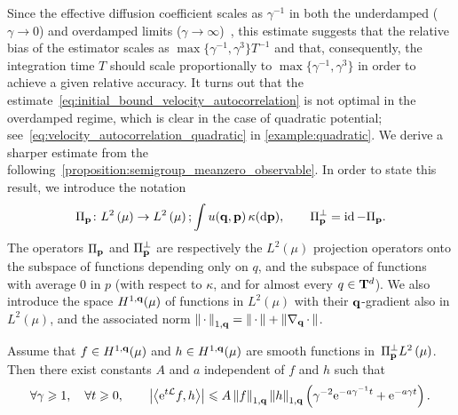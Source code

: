 \documentclass[11pt,a4paper]{article}
\begin{document}
Since the effective diffusion coefficient scales as $\gamma^{-1}$ in both the underdamped ($\gamma \to 0$) and overdamped limits ($\gamma \to \infty$)~\cite{MR2394704,MR2427108},
this estimate suggests that the relative bias of the estimator scales as $\max\{\gamma^{-1}, \gamma^3\} T^{-1}$ and that,
consequently, the integration time $T$ should scale proportionally to $\max\{\gamma^{-1}, \gamma^3\}$ in order to achieve a given relative accuracy.
It turns out that the estimate~\eqref{eq:initial_bound_velocity_autocorrelation} is not optimal in the overdamped regime,
which is clear in the case of quadratic potential; see~\eqref{eq:velocity_autocorrelation_quadratic} in \cref{example:quadratic}.
We derive a sharper estimate from the following~\cref{proposition:semigroup_meanzero_observable}.
In order to state this result,
we introduce the notation
\[
    \Pi_{\vect p}\colon \lp{2}{\mu} \rightarrow \lp{2}{\mu}; \int u(\vect q, \vect p) \, \kappa(\d \vect p),
    \qquad  \Pi_{\vect p}^\perp = \id - \Pi_{\vect p}.
\]
The operators $\Pi_{\boldsymbol{\mathbf p}}$ and $\Pi_{\boldsymbol{\mathbf p}}^\perp$ are respectively the $L^2(\mu)$ projection operators onto
the subspace of functions depending only on $q$,
and the subspace of functions with average $0$ in $p$ (with respect to $\kappa$, and for almost every $q \in \mathbf T^d$).
We also introduce the space $H^{1,\boldsymbol{\mathbf q}}(\mu)$ of functions in $L^2(\mu)$ with their $\boldsymbol{\mathbf q}$-gradient also in $L^2(\mu)$,
and the associated norm $\norm{\dummy}[1,\vect q] = \norm{\dummy} + \norm{\grad_{\vect q} \dummy}$.
\begin{proposition}
    \label{proposition:semigroup_meanzero_observable}
    Assume that $f \in H^{1,\boldsymbol{\mathbf q}}(\mu)$ and $h \in H^{1,\boldsymbol{\mathbf q}}(\mu)$ are smooth functions in~$\Pi_{\vect p}^\perp \lp{2}{\mu}$.
    Then there exist constants $A$ and $a$ independent of $f$ and $h$ such that
    \begin{equation}
        \label{eq:optimal_decay_correlation}
        \forall \gamma \geq 1, \quad
        \forall t \geq 0, \qquad
        \abs{\ip{\e^{t \mathcal L}f}{h}}
        \leq A \norm{f}[1,\vect q]  \norm{h}[1,\vect q] \left( \gamma^{-2} \e^{- a \gamma^{-1} t} + \e^{- a \gamma t} \right).
    \end{equation}
\end{proposition}
\end{document}
